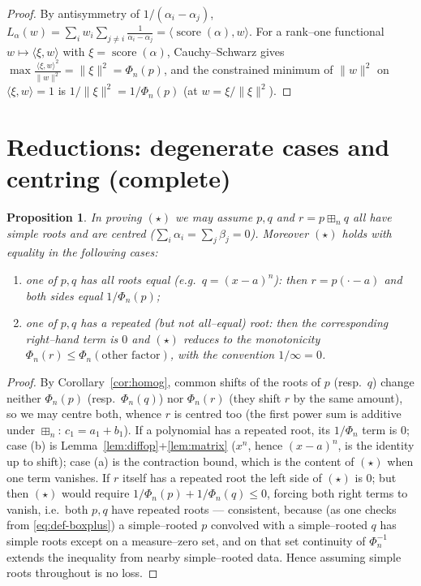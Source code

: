 \documentclass[12pt]{article}
\newtheorem{proposition}{Proposition}
\theoremstyle{definition}
\DeclareMathOperator{\score}{score}
\newcommand{\boxp}{\boxplus_n}
\begin{document}
\begin{proof}
By antisymmetry of $1/(\alpha_i-\alpha_j)$,
$L_\alpha(w)=\sum_i w_i\sum_{j\ne i}\frac1{\alpha_i-\alpha_j}=\langle\score(\alpha),w\rangle$.
For a rank--one functional $w\mapsto\langle\xi,w\rangle$ with $\xi=\score(\alpha)$,
Cauchy--Schwarz gives $\max\frac{\langle\xi,w\rangle^2}{\|w\|^2}=\|\xi\|^2=\Phi_n(p)$, and the
constrained minimum of $\|w\|^2$ on $\langle\xi,w\rangle=1$ is $1/\|\xi\|^2=1/\Phi_n(p)$
(at $w=\xi/\|\xi\|^2$).
\end{proof}

\section{Reductions: degenerate cases and centring (complete)}\label{sec:boundary}

\begin{proposition}\label{prop:reductions}
In proving $(\star)$ we may assume $p,q$ and $r=p\boxp q$ all have simple roots and are
centred ($\sum_i\alpha_i=\sum_j\beta_j=0$). Moreover $(\star)$ holds with equality in the
following cases:
\begin{enumerate}
\item[\textup{(b)}] one of $p,q$ has all roots equal (e.g.\ $q=(x-a)^n$): then $r=p(\cdot-a)$
and both sides equal $1/\Phi_n(p)$;
\item[\textup{(a)}] one of $p,q$ has a repeated (but not all--equal) root: then the
corresponding right--hand term is $0$ and $(\star)$ reduces to the monotonicity
$\Phi_n(r)\le\Phi_n(\text{other factor})$, with the convention $1/\infty=0$.
\end{enumerate}
\end{proposition}

\begin{proof}
By Corollary~\ref{cor:homog}, common shifts of the roots of $p$ (resp.\ $q$) change neither
$\Phi_n(p)$ (resp.\ $\Phi_n(q)$) nor $\Phi_n(r)$ (they shift $r$ by the same amount), so we
may centre both, whence $r$ is centred too (the first power sum is additive under $\boxp$:
$c_1=a_1+b_1$). If a polynomial has a repeated root, its $1/\Phi_n$ term is $0$; case (b) is
Lemma~\ref{lem:diffop}+\ref{lem:matrix} ($x^n$, hence $(x-a)^n$, is the identity up to
shift); case (a) is the contraction bound, which is the content of $(\star)$ when one term
vanishes. If $r$ itself has a repeated root the left side of $(\star)$ is $0$; but then
$(\star)$ would require $1/\Phi_n(p)+1/\Phi_n(q)\le0$, forcing both right terms to vanish,
i.e.\ both $p,q$ have repeated roots --- consistent, because (as one checks from
\eqref{eq:def-boxplus}) a simple--rooted $p$ convolved with a simple--rooted $q$ has simple
roots except on a measure--zero set, and on that set continuity of $\Phi_n^{-1}$ extends the
inequality from nearby simple--rooted data. Hence assuming simple roots throughout is no
loss.
\end{proof}
\end{document}
